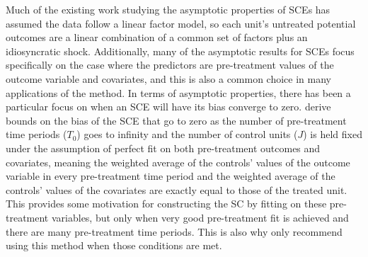 \documentclass{article}
\begin{document}
\par
Much of the existing work studying the asymptotic properties of SCEs has assumed the data follow a linear factor model, so each unit's untreated potential outcomes are a linear combination of a common set of factors plus an idiosyncratic shock. Additionally, many of the asymptotic results for SCEs focus specifically on the case where the predictors are pre-treatment values of the outcome variable and covariates, and this is also a common choice in many applications of the method. In terms of asymptotic properties, there has been a particular focus on when an SCE will have its bias converge to zero.  \cite{Abadie2010} derive bounds on the bias of the SCE that go to zero as the number of pre-treatment time periods ($T_0$) goes to infinity and the number of control units ($J$) is held fixed under the assumption of perfect fit on both pre-treatment outcomes and covariates, meaning the weighted average of the controls' values of the outcome variable in every pre-treatment time period and the weighted average of the controls' values of the covariates are exactly equal to those of the treated unit. This provides some motivation for constructing the SC by fitting on these pre-treatment variables, but only when very good pre-treatment fit is achieved and there are many pre-treatment time periods. This is also why \cite{Abadie2010} only recommend using this method when those conditions are met. 
\par
\end{document}
